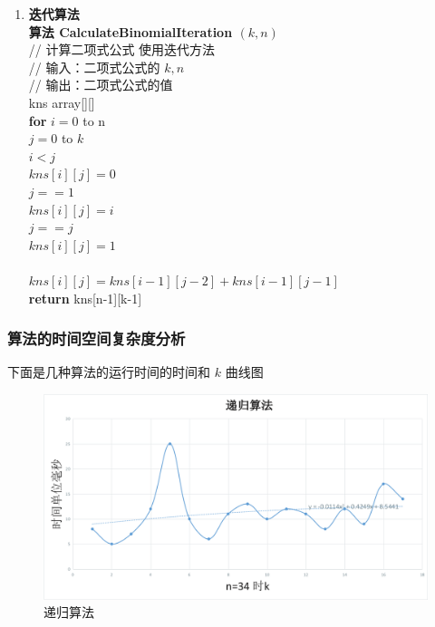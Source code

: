 \documentclass{ctexart}
\newcommand\tab[1][1cm]{\hspace*{#1}}
\begin{document}
\begin{enumerate}
   \item {\bfseries 迭代算法} \\
	{\bfseries{算法 CalculateBinomialIteration $(k, n)$ }} \\
	\tab// 计算二项式公式 使用迭代方法 \\
	\tab// 输入：二项式公式的 $k, n$ \\
	\tab// 输出：二项式公式的值 \\
	kns array[][] \\
	{\bfseries for} $i = 0$ to n \\
	\tab {\bfseries for } $j = 0$ to $k$ \\
	\tab {\bfseries if} $i < j$ \\
	\tab\tab $kns[i][j] = 0$ \\
	\tab {\bfseries else if} $j == 1$ \\
	\tab\tab $kns[i][j] = i$ \\
	\tab {\bfseries else if} $j == j$ \\
	\tab\tab $kns[i][j] = 1$ \\
	\tab {\bfseries else} \\
	\tab\tab $kns[i][j] = kns[i-1][j-2] + kns[i-1][j-1]$ \\
	{\bfseries return} kns[n-1][k-1]
\end{enumerate}
\subsubsection{算法的时间空间复杂度分析}
下面是几种算法的运行时间的时间和 $k$ 曲线图
\begin{figure}[H]
	\centering
	\includegraphics[scale=0.5]{../images/recursion.png}
	\caption{递归算法}
\end{figure}
\end{document}
